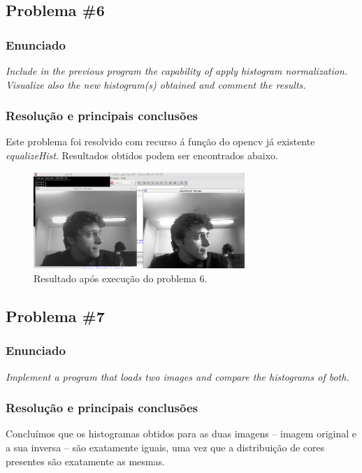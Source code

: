 \documentclass[portuguese, times, mirror]{revdetua}
\begin{document}
\subsection{Problema \#6}

\subsubsection{Enunciado}
\textit{Include in the previous program the capability of apply histogram normalization. Visualize also
the new histogram(s) obtained and comment the results.}

\subsubsection{Resolução e principais conclusões}

Este problema foi resolvido com recurso á função do opencv já existente \textit{equalizeHist}. Resultados obtidos podem ser encontrados abaixo.

\begin{figure}[ht!]
\centering
\includegraphics[width=80mm]{img/ex6.png}
\caption{Resultado após execução do problema 6.}
\end{figure}

\subsection{Problema \#7}

\subsubsection{Enunciado}
\textit{Implement a program that loads two images and compare the histograms of both.}

\subsubsection{Resolução e principais conclusões}



Concluímos que os histogramas obtidos para as duas imagens – imagem original e a sua inversa – são exatamente iguais, uma vez que a distribuição de cores presentes são exatamente as mesmas.  
\end{document}
